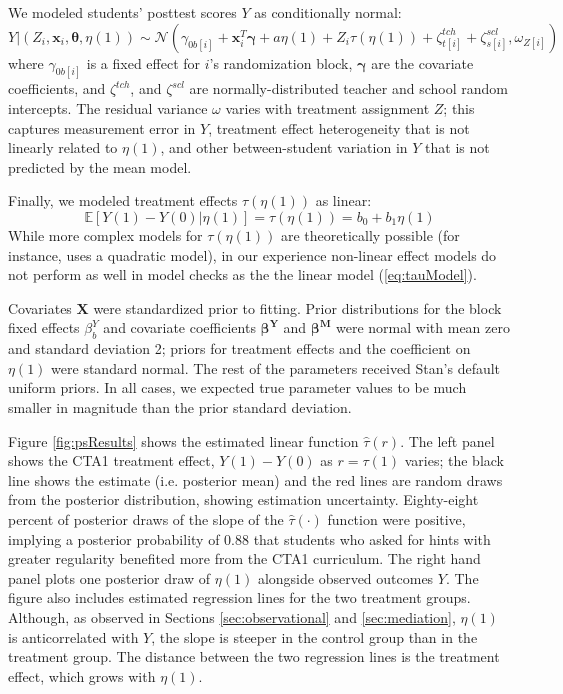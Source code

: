 \documentclass{article}\usepackage[]{graphicx}\usepackage[]{color}
\newcommand{\EE}{\mathbb{E}}
\begin{document}
We modeled students' posttest scores $Y$ as
conditionally normal:
\begin{equation}\label{eq:outcomeSubmodel}
 Y|\left(Z_i,\bm{x}_i,\bm{\theta},\eta(1)\right) \sim  \mathcal{N}\left(
\gamma_{0b[i]}+\bm{x}_i^T\bm{\gamma}+a\eta(1)+Z_i\tau(\eta(1))+\zeta^{tch}_{t[i]}+\zeta^{scl}_{s[i]},\omega_{Z[i]}\right)
\end{equation}
where $\gamma_{0b[i]}$ is a fixed effect for $i$'s randomization block, $\bm{\gamma}$ are the
covariate coefficients, and $\zeta^{tch}$, and
$\zeta^{scl}$ are normally-distributed teacher and school random
intercepts.
The residual variance $\omega$ varies with treatment assignment $Z$;
this captures measurement error in $Y$, treatment effect heterogeneity
that is not linearly related to
$\eta(1)$, and other between-student variation in $Y$ that is not predicted by
the mean model.

Finally, we modeled treatment effects
$\tau(\eta(1))$ as linear:
\begin{equation}\label{eq:tauModel}
\EE[Y(1)-Y(0)|\eta(1)]=\tau({\eta(1)})=b_0+b_1\eta(1)
\end{equation}
While more complex models for $\tau(\eta(1))$ are theoretically
possible (for instance, \citet{jin2008principal} uses a quadratic
model), in our experience non-linear effect models do not perform as
well in model checks as the the linear model (\ref{eq:tauModel}).

Covariates $\bm{X}$ were standardized prior to fitting.
Prior distributions for the block fixed effects $\beta^Y_b$ and covariate coefficients
$\bm{\beta^Y}$ and $\bm{\beta^M}$ were normal with mean zero and
standard deviation 2;
priors for treatment effects and the coefficient on $\eta(1)$ were standard
normal.
The rest of the parameters received Stan's default uniform priors.
In all cases, we expected true parameter values to be much smaller in
magnitude than the prior standard deviation.

Figure \ref{fig:psResults} shows the estimated linear function
$\hat{\tau}(r)$.
The left panel shows the CTA1 treatment effect, $Y(1)-Y(0)$ as
$r=\tau(1)$ varies; the black line shows the estimate (i.e. posterior
mean) and the red lines are random draws from the posterior
distribution, showing estimation uncertainty.
Eighty-eight percent of posterior draws of the slope of the
$\hat{\tau}(\cdot)$ function were positive, implying a posterior
probability of 0.88 that students who asked for hints
with greater regularity benefited more from the CTA1 curriculum.
The right hand panel plots one posterior draw of $\eta(1)$
alongside observed outcomes $Y$.
The figure also includes estimated regression lines for the two
treatment groups.
Although, as observed in Sections \ref{sec:observational} and
\ref{sec:mediation}, $\eta(1)$ is anticorrelated with $Y$, the slope
is steeper in the control group than in the treatment group.
The distance between the two regression lines is the treatment effect,
which grows with $\eta(1)$.
\end{document}
